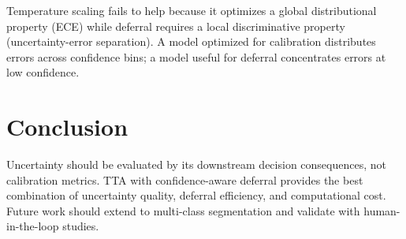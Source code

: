\documentclass[journal]{IEEEtran}
\begin{document}
Temperature scaling fails to help because it optimizes a global distributional
property (ECE) while deferral requires a local discriminative property
(uncertainty-error separation). A model optimized for calibration distributes
errors across confidence bins; a model useful for deferral concentrates errors
at low confidence.

\section{Conclusion}

Uncertainty should be evaluated by its downstream decision consequences, not
calibration metrics. TTA with confidence-aware deferral provides the best
combination of uncertainty quality, deferral efficiency, and computational cost.
Future work should extend to multi-class segmentation and validate with
human-in-the-loop studies.



\end{document}

